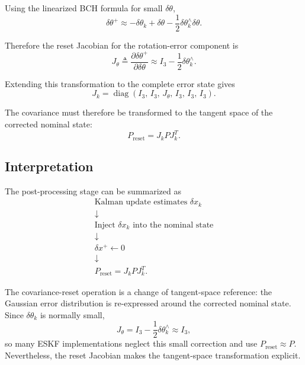 \documentclass[11pt]{article}
\numberwithin{equation}{section}
\begin{document}
Using the linearized BCH formula for small $\delta\theta$,
\begin{equation}
\boxed{
\delta\theta^+
\approx
-\delta\theta_k
+\delta\theta
-\frac{1}{2}\delta\theta_k^\wedge\delta\theta.
}
\end{equation}

Therefore the reset Jacobian for the rotation-error component is
\begin{equation}
\boxed{
J_\theta
\triangleq
\frac{\partial\delta\theta^+}{\partial\delta\theta}
\approx
I_3-\frac{1}{2}\delta\theta_k^\wedge.
}
\end{equation}

Extending this transformation to the complete error state gives
\begin{equation}
\boxed{
J_k
=
\operatorname{diag}
\left(
I_3,\,
I_3,\,
J_\theta,\,
I_3,\,
I_3,\,
I_3
\right).
}
\end{equation}

The covariance must therefore be transformed to the tangent space of
the corrected nominal state:
\begin{equation}
\boxed{
P_{\mathrm{reset}}
=
J_k P J_k^T.
}
\end{equation}

\subsection{Interpretation}

The post-processing stage can be summarized as
\[
\boxed{
\begin{array}{c}
\text{Kalman update estimates }\delta x_k
\\[1mm]
\downarrow
\\[1mm]
\text{Inject }\delta x_k\text{ into the nominal state}
\\[1mm]
\downarrow
\\[1mm]
\delta x^+\leftarrow 0
\\[1mm]
\downarrow
\\[1mm]
P_{\mathrm{reset}}=J_kPJ_k^T.
\end{array}
}
\]

The covariance-reset operation is a change of tangent-space reference:
the Gaussian error distribution is re-expressed around the corrected
nominal state.  Since $\delta\theta_k$ is normally small,
\[
J_\theta
=
I_3-\frac12\delta\theta_k^\wedge
\approx I_3,
\]
so many ESKF implementations neglect this small correction and use
$P_{\mathrm{reset}}\approx P$.  Nevertheless, the reset Jacobian makes
the tangent-space transformation explicit.
\end{document}
